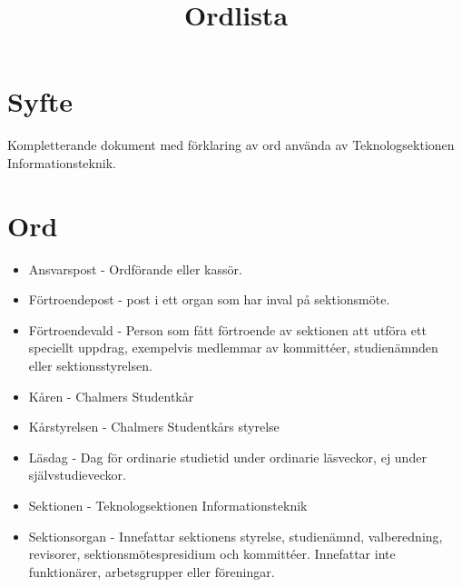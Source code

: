 \documentclass[11pt, includeaddress]{classes/cthit}
\begin{document}
\title{Ordlista}
\maketitle

\thispagestyle{empty}

\newpage

\makeheadfoot%

\setcounter{tocdepth}{2}
\setcounter{page}{1}

\section{Syfte}
Kompletterande dokument med förklaring av ord använda av Teknologsektionen Informationsteknik.

\section{Ord}
\begin{itemize}
	\item Ansvarspost - Ordförande eller kassör.
	\item Förtroendepost - post i ett organ som har inval på sektionsmöte.
	\item Förtroendevald - Person som fått förtroende av sektionen att utföra ett speciellt uppdrag, exempelvis medlemmar av kommittéer, studienämnden eller sektionsstyrelsen.
	\item Kåren - Chalmers Studentkår
	\item Kårstyrelsen - Chalmers Studentkårs styrelse
	\item Läsdag - Dag för ordinarie studietid under ordinarie läsveckor, ej under självstudieveckor.
	\item Sektionen - Teknologsektionen Informationsteknik
	\item Sektionsorgan - Innefattar sektionens styrelse, studienämnd, valberedning, revisorer, sektionsmötespresidium och kommittéer. Innefattar inte funktionärer, arbetsgrupper eller föreningar.
\end{itemize}
\end{document}
